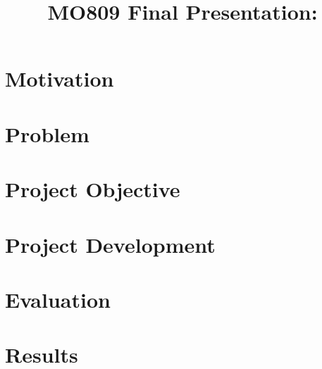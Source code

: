 \documentclass[aspectratio=169]{beamer}
\title{MO809 Final Presentation: \ProjectTitle}
\author{\ProjectAuthor}
\begin{document}
\MoverTitleSlide


\section{Motivation}


\section{Problem}



\section{Project Objective}



\section{Project Development}







\section{Evaluation}




\section{Results}



\MoverThanksSlide

\appendix
\FinalAppendixtrue

\end{document}
